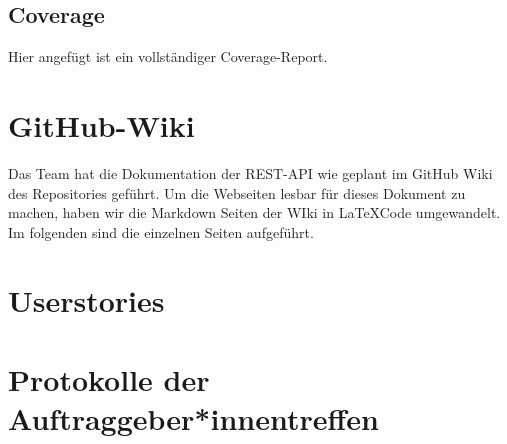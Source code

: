 \documentclass[accentcolor=tud0b,12pt,paper=a4]{tudreport}
\begin{document}
	\section{Coverage}
	Hier angefügt ist ein vollständiger Coverage-Report.
	
	
	
	
	
	
	
	
	

\chapter{GitHub-Wiki}
	Das Team hat die Dokumentation der REST-API wie geplant im GitHub Wiki des Repositories geführt. Um die Webseiten lesbar für dieses Dokument zu machen, haben wir die Markdown Seiten der WIki in \LaTeX Code umgewandelt. Im folgenden sind die einzelnen Seiten aufgeführt.


	
	
	
	
	
	
	
	
	
	
	
	
		

\chapter{Userstories}
	


\chapter{Protokolle der Auftraggeber*innentreffen}
\end{document}
